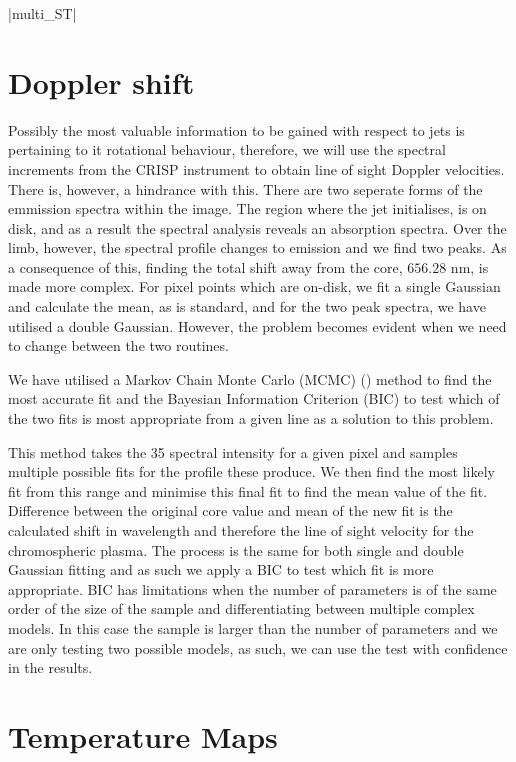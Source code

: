 \documentclass{emulateapj}
\begin{document}
\py[STEREO]|multi_ST|



\section{Doppler shift}
\label{dop_shift_sect}

Possibly the most valuable information to be gained with respect to jets is pertaining to it rotational behaviour, therefore, we will use the spectral increments from the CRISP instrument to obtain line of sight Doppler velocities.
There is, however, a hindrance with this.
There are two seperate forms of the emmission spectra within the image.
The region where the jet initialises, is on disk, and as a result the spectral analysis reveals an absorption spectra.
Over the limb, however, the spectral profile changes to emission and we find two peaks.
As a consequence of this, finding the total shift away from the core, $656.28$ nm, is made more complex.
For pixel points which are on-disk, we fit a single Gaussian and calculate the mean, as is standard, and for the two peak spectra, we have utilised a double Gaussian.
However, the problem becomes evident when we need to change between the two routines.

We have utilised a Markov Chain Monte Carlo (MCMC) (\cite{Richey2010}) method to find the most accurate fit and the Bayesian Information Criterion (BIC) to test which of the two fits is most appropriate from a given line as a solution to this problem.

This method takes the 35 spectral intensity for a given pixel and samples multiple possible fits for the profile these produce.
We then find the most likely fit from this range and minimise this final fit to find the mean value of the fit.
Difference between the original core value and mean of the new fit is the calculated shift in wavelength and therefore the line of sight velocity for the chromospheric plasma.
The process is the same for both single and double Gaussian fitting and as such we apply a BIC to test which fit is more appropriate.
BIC has limitations when the number of parameters is of the same order of the size of the sample and differentiating between multiple complex models.
In this case the sample is larger than the number of parameters and we are only testing two possible models, as such, we can use the test with confidence in the results.





\section{Temperature Maps}
\label{temp_map_sect}
\end{document}
